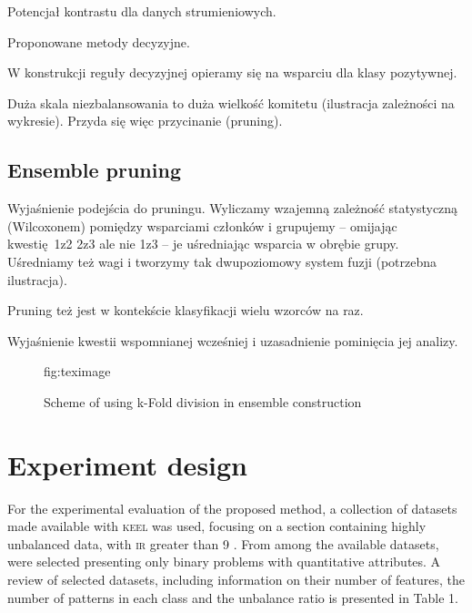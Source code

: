 \documentclass[pmlr]{jmlr}
\begin{document}
Potencjał kontrastu dla danych strumieniowych.

Proponowane metody decyzyjne.

W konstrukcji reguły decyzyjnej opieramy się na wsparciu dla klasy pozytywnej.


Duża skala niezbalansowania to duża wielkość komitetu (ilustracja zależności na wykresie). Przyda się więc przycinanie (pruning).

\subsection{Ensemble pruning}

Wyjaśnienie podejścia do pruningu. Wyliczamy wzajemną zależność statystyczną (Wilcoxonem) pomiędzy wsparciami członków i grupujemy -- omijając kwestię 1z2 2z3 ale nie 1z3 -- je uśredniając wsparcia w obrębie grupy. Uśredniamy też wagi i tworzymy tak dwupoziomowy system fuzji (potrzebna ilustracja).

Pruning też jest w kontekście klasyfikacji wielu wzorców na raz.

Wyjaśnienie kwestii wspomnianej wcześniej i uzasadnienie pominięcia jej analizy. 


\begin{figure}[!h]
\floatconts
  {fig:teximage}
  {\caption{Scheme of using k-Fold division in ensemble construction}}
  {}
\end{figure}

\section{Experiment design}
\label{sec:intro}

For the experimental evaluation of the proposed method, a collection of datasets made available with \textsc{keel} \citep{alcala2011keel} was used, focusing on a section containing highly unbalanced data, with \textsc{ir} greater than 9 \citep{fernandez2009hierarchical}. From among the available datasets,  were selected presenting only binary problems with quantitative attributes. A review of selected datasets, including information on their number of features, the number of patterns in each class and the unbalance ratio is presented in Table 1.
\end{document}
